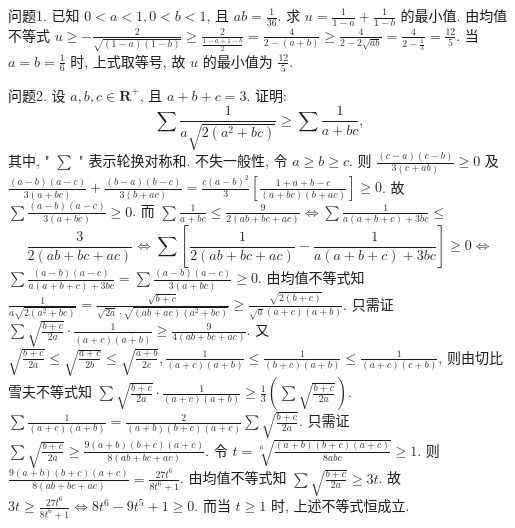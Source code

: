 
问题1. 已知 $0<a<1,0<b<1$, 且 $a b=\frac{1}{36}$. 求 $u=\frac{1}{1-a}+\frac{1}{1-b}$ 的最小值.
由均值不等式 $u \geqslant-\frac{2}{\sqrt{(1-a)(1-b)}} \geqslant \frac{2}{\frac{1-a+1-b}{2}}= \frac{4}{2-(a+b)} \geqslant \frac{4}{2-2 \sqrt{a b}}=\frac{4}{2-\frac{1}{3}}=\frac{12}{5}$. 当 $a=b=\frac{1}{6}$ 时, 上式取等号, 故 $u$ 的最小值为 $\frac{12}{5}$.



问题2. 设 $a, b, c \in \mathbf{R}^{+}$, 且 $a+b+c=3$. 证明:
$$
\sum \frac{1}{a \sqrt{2\left(a^2+b c\right)}} \geqslant \sum \frac{1}{a+b c},
$$
其中, " $\sum$ " 表示轮换对称和.
不失一般性, 令 $a \geqslant b \geqslant c$. 则 $\frac{(c-a)(c-b)}{3(c+a b)} \geqslant 0$ 及 $\frac{(a-b)(a-c)}{3(a+b c)}+ \frac{(b-a)(b-c)}{3(b+a c)}=\frac{c(a-b)^2}{3}\left[\frac{1+a+b-c}{(a+b c)(b+a c)}\right] \geqslant 0$. 故 $\sum \frac{(a-b)(a-c)}{3(a+b c)} \geqslant 0$. 而 $\sum \frac{1}{a+b c} \leqslant \frac{9}{2(a b+b c+a c)} \Leftrightarrow \sum \frac{1}{a(a+b+c)+3 b c} \leqslant$
$$
\frac{3}{2(a b+b c+a c)} \Leftrightarrow \sum\left[\frac{1}{2(a b+b c+a c)}-\frac{1}{a(a+b+c)+3 b c}\right] \geqslant 0 \Leftrightarrow
$$
$\sum \frac{(a-b)(a-c)}{a(a+b+c)+3 b c}=\sum \frac{(a-b)(a-c)}{3(a+b c)} \geqslant 0$. 由均值不等式知
$\frac{1}{a \sqrt{2\left(a^2+b c\right)}}=\frac{\sqrt{b+c}}{\sqrt{2 a} \cdot \sqrt{(a b+a c)\left(a^2+b c\right)}} \geqslant \frac{\sqrt{2(b+c)}}{\sqrt{a}(a+c)(a+b)}$. 只需证 $\sum \sqrt{\frac{b+c}{2 a}} \cdot \frac{1}{(a+c) \overline{(a+b)}} \geqslant \frac{9}{4(a b+b c+a c)}$. 又 $\sqrt{\frac{b+c}{2 a}} \leqslant\sqrt{\frac{a+c}{2 b}} \leqslant \sqrt{\frac{a+b}{2 c}}, \frac{1}{(a+c)(a+b)} \leqslant \frac{1}{(b+c)(a+b)} \leqslant \frac{1}{(a+c)(c+b)}$,
则由切比雪夫不等式知 $\sum \sqrt{\frac{b+c}{2 a}} \cdot \frac{1}{(a+c)(a+b)} \geqslant \frac{1}{3}\left(\sum \sqrt{\frac{b+c}{2 a}}\right)$.
$\sum \frac{1}{(a+c)(a+b)}=\frac{2}{(a+b)(b+c)(a+c)} \sum \sqrt{\frac{b+c}{2 a}}$. 只需证 $\sum \sqrt{\frac{b+c}{2 a}}\geqslant \frac{9(a+b)(b+c)(a+c)}{8(a b+b c+a c)}$. 令 $t=\sqrt[6]{\frac{(a+b)(b+c)(a+c)}{8 a b c}} \geqslant 1$. 则
$\frac{9(a+b)(b+c)(a+c)}{8(a b+b c+a c)}=\frac{27 t^6}{8 t^6+1}$. 由均值不等式知 $\sum \sqrt{\frac{b+c}{2 a}} \geqslant 3 t$. 故
$3 t \geqslant \frac{27 t^6}{8 t^6+1} \Leftrightarrow 8 t^6-9 t^5+1 \geqslant 0$. 而当 $t \geqslant 1$ 时, 上述不等式恒成立.



